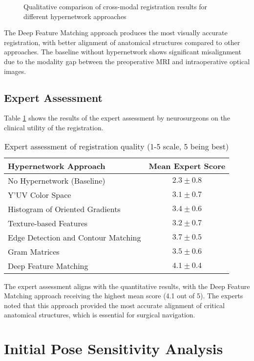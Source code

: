 \begin{figure}[h]
\centering
\caption{Qualitative comparison of cross-modal registration results for different hypernetwork approaches}
\label{fig:hypernetwork_qualitative}
\end{figure}

The Deep Feature Matching approach produces the most visually accurate registration, with better alignment of anatomical structures compared to other approaches. The baseline without hypernetwork shows significant misalignment due to the modality gap between the preoperative MRI and intraoperative optical images.

\subsection{Expert Assessment}
Table \ref{tab:expert_assessment} shows the results of the expert assessment by neurosurgeons on the clinical utility of the registration.

\begin{table}[h]
\centering
\caption{Expert assessment of registration quality (1-5 scale, 5 being best)}
\label{tab:expert_assessment}
\begin{tabular}{lc}
\toprule
\textbf{Hypernetwork Approach} & \textbf{Mean Expert Score} \\
\midrule
No Hypernetwork (Baseline) & $2.3 \pm 0.8$ \\
Y'UV Color Space & $3.1 \pm 0.7$ \\
Histogram of Oriented Gradients & $3.4 \pm 0.6$ \\
Texture-based Features & $3.2 \pm 0.7$ \\
Edge Detection and Contour Matching & $3.7 \pm 0.5$ \\
Gram Matrices & $3.5 \pm 0.6$ \\
Deep Feature Matching & $4.1 \pm 0.4$ \\
\bottomrule
\end{tabular}
\end{table}

The expert assessment aligns with the quantitative results, with the Deep Feature Matching approach receiving the highest mean score (4.1 out of 5). The experts noted that this approach provided the most accurate alignment of critical anatomical structures, which is essential for surgical navigation.

\section{Initial Pose Sensitivity Analysis}


